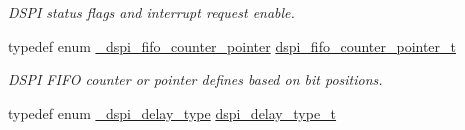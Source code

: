 \begin{DoxyCompactItemize}
\begin{DoxyCompactList}\small\item\em D\+S\+PI status flags and interrupt request enable. \end{DoxyCompactList}\item 
typedef enum \hyperlink{group__dspi__hal_ga7840b2a1d0cefe7f4168ab8384ee0e99}{\+\_\+dspi\+\_\+fifo\+\_\+counter\+\_\+pointer} \hyperlink{group__dspi__hal_ga637a55caf13059a9b15922c74b1031fe}{dspi\+\_\+fifo\+\_\+counter\+\_\+pointer\+\_\+t}\hypertarget{group__dspi__hal_ga637a55caf13059a9b15922c74b1031fe}{}\label{group__dspi__hal_ga637a55caf13059a9b15922c74b1031fe}

\begin{DoxyCompactList}\small\item\em D\+S\+PI F\+I\+FO counter or pointer defines based on bit positions. \end{DoxyCompactList}\item 
typedef enum \hyperlink{group__dspi__hal_ga86dbb9c380b74c6654a44a73e90573f9}{\+\_\+dspi\+\_\+delay\+\_\+type} \hyperlink{group__dspi__hal_gaf817b2c70ff1e28088181cd418f4528b}{dspi\+\_\+delay\+\_\+type\+\_\+t}\hypertarget{group__dspi__hal_gaf817b2c70ff1e28088181cd418f4528b}{}\label{group__dspi__hal_gaf817b2c70ff1e28088181cd418f4528b}


\end{DoxyCompactItemize}
